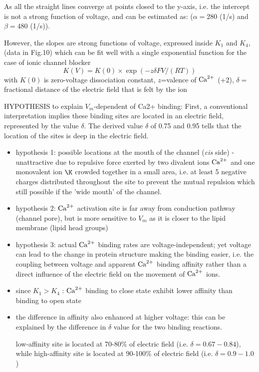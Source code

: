 As all the straight lines converge at points closed to the y-axis, i.e.
the intercept is not a strong function of voltage, and can be estimated
as: ($\alpha=280$ (1/s) and $\beta=480$ (1/s)).

However, the slopes are strong functions of voltage, expressed inside $K_1$ and
$K_4$, (data in Fig.10) which can be fit well with a single exponential function
for the case of ionic channel blocker
\begin{equation}
K(V) = K(0)	 \times \exp\left(-z\delta FV/(RT)\right)
\end{equation}
with $K(0)$ is zero-voltage dissociation constant, $z$=valence of ${\text{Ca}^{2+}}$ (+2),
$\delta	=$ fractional distance of the electric field that is felt by the ion

\begin{mdframed}

HYPOTHESIS to explain $V_m$-dependent of Ca2+ binding: 
First, a conventional interpretation implies these binding sites are located in
an electric field, represented by the value $\delta$. The derived value $\delta$
of 0.75 and 0.95 tells that the location of the sites is deep in the electric
field.
\begin{itemize}
  \item hypothesis 1: possible locations at the mouth of the channel ({\it cis}
  side) - unattractive due to repulsive force exerted by two divalent ions ${\text{Ca}^{2+}}$
  and one monovalent ion $\K$ crowded together in a small area, i.e. at least 5
  negative charges distributed throughout the site to prevent the mutual
  repulsion which still possible if the 'wide mouth' of the channel.
  
  \item hypothesis 2:  ${\text{Ca}^{2+}}$ activation site is far away from conduction pathway
  (channel pore), but is more sensitive to $V_m$ as it is closer to the lipid
  membrane (lipid head groups)

  \item hypothesis 3: actual ${\text{Ca}^{2+}}$ binding rates are voltage-independent; yet
  voltage can lead to the change in protein structure making the binding easier,
  i.e.  the coupling between voltage and apparent ${\text{Ca}^{2+}}$ binding affinity rather
  than a direct influence of the electric field on the movement of ${\text{Ca}^{2+}}$ ions.

\end{itemize}

\end{mdframed}


\begin{itemize}
  \item since $K_1 > K_4$ : ${\text{Ca}^{2+}}$ binding to close state exhibit lower affinity
  than binding to open state 
  
  \item the difference in affinity also enhanced at higher voltage: this can be
  explained by the difference in $\delta $ value for the two binding reactions.
  
  low-affinity site is located at 70-80\% of electric field (i.e.
  $\delta =  0.67-0.84$), while high-affinity site is located at 90-100\% of
  electric field (i.e. $\delta = 0.9-1.0$)
\end{itemize}

